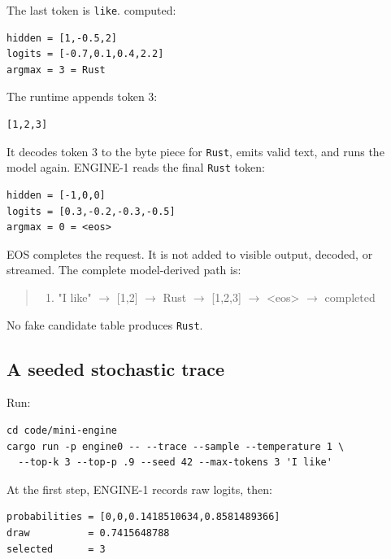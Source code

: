 The last token is \texttt{like}.  computed:

\begin{verbatim}
hidden = [1,-0.5,2]
logits = [-0.7,0.1,0.4,2.2]
argmax = 3 = Rust
\end{verbatim}

The runtime appends token 3:

\begin{verbatim}
[1,2,3]
\end{verbatim}

It decodes token 3 to the byte piece for \texttt{Rust}, emits valid
text, and runs the model again. ENGINE-1 reads the final \texttt{Rust}
token:

\begin{verbatim}
hidden = [-1,0,0]
logits = [0.3,-0.2,-0.3,-0.5]
argmax = 0 = <eos>
\end{verbatim}

EOS completes the request. It is not added to visible output, decoded,
or streamed. The complete model-derived path is:

\begin{quote}
\begin{enumerate}
\item "I like"  \(\longrightarrow\)  [1,2]  \(\longrightarrow\)  Rust  \(\longrightarrow\)  [1,2,3]  \(\longrightarrow\)  <eos>  \(\longrightarrow\)  completed
\end{enumerate}
\end{quote}

No fake candidate table produces \texttt{Rust}.

\subsection{A seeded stochastic
trace}\label{a-seeded-stochastic-trace}

Run:

\begin{verbatim}
cd code/mini-engine
cargo run -p engine0 -- --trace --sample --temperature 1 \
  --top-k 3 --top-p .9 --seed 42 --max-tokens 3 'I like'
\end{verbatim}

At the first step, ENGINE-1 records raw logits, then:

\begin{verbatim}
probabilities = [0,0,0.1418510634,0.8581489366]
draw          = 0.7415648788
selected      = 3
\end{verbatim}

